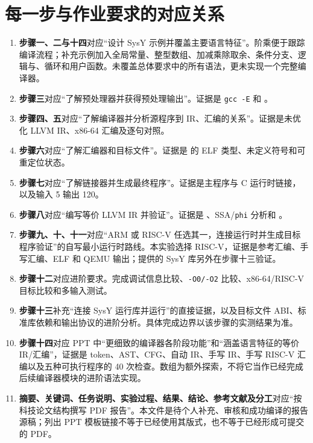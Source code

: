 \documentclass[UTF8,a4paper,12pt]{ctexart}
\begin{document}
\section{每一步与作业要求的对应关系}

\begin{enumerate}
  \item \textbf{步骤一、二与十四}对应“设计 SysY 示例并覆盖主要语言特征”。阶乘便于跟踪编译流程；补充示例加入全局常量、整型数组、加减乘除取余、条件分支、逻辑与、循环和用户函数。未覆盖总体要求中的所有语法，更未实现一个完整编译器。
  \item \textbf{步骤三}对应“了解预处理器并获得预处理输出”。证据是 \texttt{gcc -E} 和 。
  \item \textbf{步骤四、五}对应“了解编译器并分析源程序到 IR、汇编的关系”。证据是未优化 LLVM IR、x86-64 汇编及逐句对照。
  \item \textbf{步骤六}对应“了解汇编器和目标文件”。证据是  的 ELF 类型、未定义符号和可重定位状态。
  \item \textbf{步骤七}对应“了解链接器并生成最终程序”。证据是主程序与 C 运行时链接，以及输入 5 输出 120。
  \item \textbf{步骤八}对应“编写等价 LLVM IR 并验证”。证据是 、SSA/\texttt{phi} 分析和 。
  \item \textbf{步骤九、十、十一}对应“ARM 或 RISC-V 任选其一，连接运行时并生成目标程序验证”的自写最小运行时路线。本实验选择 RISC-V，证据是参考汇编、手写汇编、ELF 和 QEMU 输出；提供的 SysY 库另外在步骤十三验证。
  \item \textbf{步骤十二}对应进阶要求。完成调试信息比较、\texttt{-O0/-O2} 比较、x86-64/RISC-V 目标比较和多输入测试。
  \item \textbf{步骤十三}补充“连接 SysY 运行库并运行”的直接证据，以及目标文件 ABI、标准库依赖和输出协议的进阶分析。具体完成边界以该步骤的实测结果为准。
  \item \textbf{步骤十四}对应 PPT 中“更细致的编译器各阶段功能”和“涵盖语言特征的等价 IR/汇编”，证据是 token、AST、CFG、自动 IR、手写 IR、手写 RISC-V 汇编以及五种可执行程序的 40 次检查。数组为额外探索，不将它当作已经完成后续编译器模块的进阶语法实现。
  \item \textbf{摘要、关键词、任务说明、实验过程、结果、结论、参考文献及分工}对应“按科技论文结构撰写 PDF 报告”。本文件是待个人补充、审核和成功编译的报告源稿；列出 PPT 模板链接不等于已经使用其版式，也不等于已经形成可提交的 PDF。
\end{enumerate}
\end{document}
